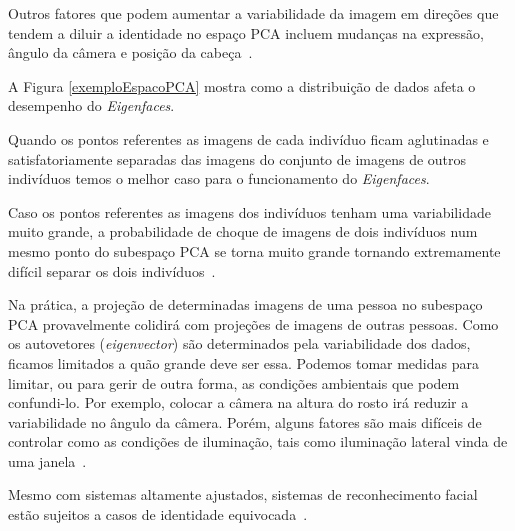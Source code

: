 Outros fatores que podem aumentar a variabilidade da imagem em direções que tendem a diluir a identidade no espaço PCA incluem mudanças na expressão, ângulo da câmera e posição da cabeça~\cite{hewitt}.

A Figura \ref{exemploEspacoPCA} mostra como a distribuição de dados afeta o desempenho do \textit{Eigenfaces}.

Quando os pontos referentes as imagens de cada indivíduo ficam aglutinadas e satisfatoriamente separadas das imagens do conjunto de imagens de outros indivíduos temos o melhor caso para o funcionamento do \textit{Eigenfaces}.

Caso os pontos referentes as imagens dos indivíduos tenham uma variabilidade muito grande, a probabilidade de choque de imagens de dois indivíduos num mesmo ponto do subespaço PCA se torna muito grande tornando extremamente difícil separar os dois indivíduos~\cite{hewitt}.

Na prática, a projeção de determinadas imagens de uma pessoa no subespaço PCA provavelmente colidirá com projeções de imagens de outras pessoas. Como os autovetores (\textit{eigenvector}) são determinados pela variabilidade dos dados, ficamos limitados a quão grande deve ser essa. Podemos tomar medidas para limitar, ou para gerir de outra forma, as condições ambientais que podem confundi-lo. Por exemplo, colocar a câmera na altura do rosto irá reduzir a variabilidade no ângulo da câmera. Porém, alguns fatores são mais difíceis de controlar como as condições de iluminação, tais como iluminação lateral vinda de uma janela~\cite{hewitt}.

Mesmo com sistemas altamente ajustados, sistemas de reconhecimento facial estão sujeitos a casos de identidade equivocada~\cite{hewitt}.

